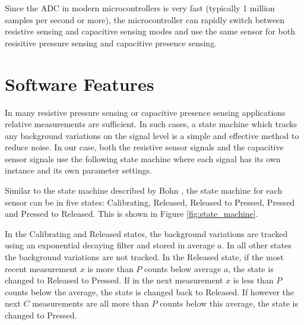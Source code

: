 \documentclass{sigchi-ext}
\begin{document}
Since the ADC in modern microcontrollers is very fast (typically 1 million
samples per second or more), the microcontroller can rapidly switch between
resistive sensing and capacitive sensing modes and use the same sensor for both
resisitive pressure sensing and capacitive presence sensing.

\section{Software Features}
In many resistive pressure sensing or capacitive presence sensing
applications relative measurements are sufficient. In such cases, a state
machine which tracks any background variations on the signal level is a simple
and effective method to reduce noise. In our case, both the resistive sensor
signals and the capacitive sensor signals use the following state machine where
each signal has its own instance and its own parameter settings.

Similar to the state machine described by Bohn \cite{Bohn2009}, the state
machine for each sensor can be in five states: Calibrating, Released, Released
to Pressed, Pressed and Pressed to Released. This is shown in Figure
\ref{fig:state_machine}.

In the Calibrating and Released states, the background variations are tracked
using an exponential decaying filter and stored in average $a$. In all other
states the background variations are not tracked. In the Released state, if the
most recent measurement $x$ is more than $P$ counts below average $a$, the state
is changed to Released to Pressed. If in the next measurement $x$ is less
than $P$ counts below the average, the state is changed back to Released. If
however the next $C$ measurements are all more than $P$ counts below this
average, the state is changed to Pressed.
\end{document}
